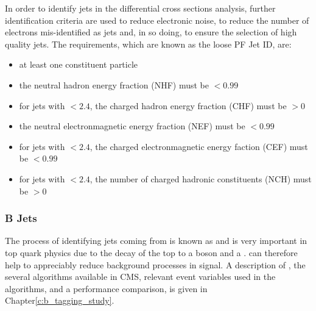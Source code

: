 In order to identify jets in the differential cross sections analysis, further identification criteria are
used to reduce electronic noise, to reduce the number of electrons mis-identified as jets and, in so doing, to
ensure the selection of high quality jets. The requirements, which are known as the loose PF Jet ID, are:

\begin{itemize}
  \item at least one constituent particle
  \item the neutral hadron energy fraction (NHF) must be $<0.99$
  \item for jets with \abseta$<2.4$, the charged hadron energy fraction (CHF) must be $>0$
  \item the neutral electronmagnetic energy fraction (NEF) must be $<0.99$
  \item for jets with \abseta$<2.4$, the charged electronmagnetic energy faction (CEF) must be $<0.99$
  \item for jets with \abseta$<2.4$, the number of charged hadronic constituents (NCH) must be $>0$
\end{itemize}

\subsubsection{B Jets}
\label{sss:b_jets}
The process of identifying jets coming from \bquarks is known as \btagging and is very important in top quark
physics due to the decay of the top to a \W boson and a \bquark. \btagging can therefore help to appreciably
reduce background processes in signal. A description of \btagging, the several algorithms available in CMS,
relevant event variables used in the algorithms, and a performance comparison, is given in
Chapter\ref{c:b_tagging_study}.
